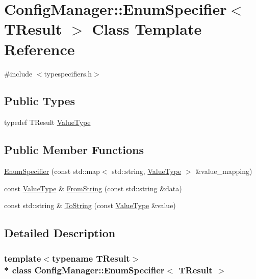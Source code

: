 \hypertarget{class_config_manager_1_1_enum_specifier}{}\section{Config\+Manager\+:\+:Enum\+Specifier$<$ T\+Result $>$ Class Template Reference}
\label{class_config_manager_1_1_enum_specifier}


{\ttfamily \#include $<$typespecifiers.\+h$>$}

\subsection*{Public Types}
\begin{DoxyCompactItemize}
\item 
typedef T\+Result \hyperlink{class_config_manager_1_1_enum_specifier_a05ef7c4dcc62170fb20c2626d65c73ab}{Value\+Type}
\end{DoxyCompactItemize}
\subsection*{Public Member Functions}
\begin{DoxyCompactItemize}
\item 
\hyperlink{class_config_manager_1_1_enum_specifier_a70c4b632b975b383b5c7ea087e229425}{Enum\+Specifier} (const std\+::map$<$ std\+::string, \hyperlink{class_config_manager_1_1_enum_specifier_a05ef7c4dcc62170fb20c2626d65c73ab}{Value\+Type} $>$ \&value\+\_\+mapping)
\item 
const \hyperlink{class_config_manager_1_1_enum_specifier_a05ef7c4dcc62170fb20c2626d65c73ab}{Value\+Type} \& \hyperlink{class_config_manager_1_1_enum_specifier_a12977b0c8cb9294a4722c6ba74d08788}{From\+String} (const std\+::string \&data)
\item 
const std\+::string \& \hyperlink{class_config_manager_1_1_enum_specifier_a619291d6ec0416be07139767429ba412}{To\+String} (const \hyperlink{class_config_manager_1_1_enum_specifier_a05ef7c4dcc62170fb20c2626d65c73ab}{Value\+Type} \&value)
\end{DoxyCompactItemize}


\subsection{Detailed Description}
\subsubsection*{template$<$typename T\+Result$>$\\*
class Config\+Manager\+::\+Enum\+Specifier$<$ T\+Result $>$}


